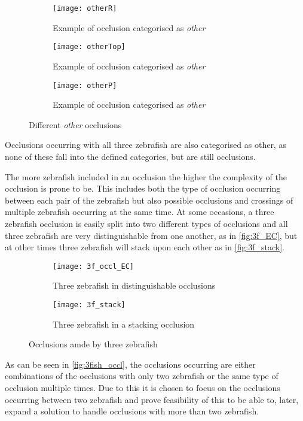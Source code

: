 \begin{figure}[H]
	\centering
	\begin{subfigure}[b]{0.3\textwidth}
		\texttt{[image: otherR]}
		\caption{Example of occlusion categorised as \textit{other}}
		\label{fig:otherR}
	\end{subfigure}
	\begin{subfigure}[b]{0.3\textwidth}
		\texttt{[image: otherTop]}
		\caption{Example of occlusion categorised as \textit{other}}
		\label{fig:otherTop}
	\end{subfigure}
	\begin{subfigure}[b]{0.3\textwidth}
		\texttt{[image: otherP]}
		\caption{Example of occlusion categorised as \textit{other}}
		\label{fig:otherP}
	\end{subfigure}
	\caption{Different \textit{other} occlusions}
	\label{fig:other}
\end{figure}

Occlusions occurring with all three zebrafish are also categorised as other, as none of these fall into the defined categories, but are still occlusions.

The more zebrafish included in an occlusion the higher the complexity of the occlusion is prone to be. This includes both the type of occlusion occurring between each pair of the zebrafish but also possible occlusions and crossings of multiple zebrafish occurring at the same time. 
At some occasions, a three zebrafish occlusion is easily split into two different types of occlusions and all three zebrafish are very distinguishable from one another, as in \autoref{fig:3f_EC}, but at other times three zebrafish will stack upon each other as in \autoref{fig:3f_stack}.

\begin{figure}[H]
	\centering
	\begin{subfigure}[b]{0.47\textwidth}
		\texttt{[image: 3f\_occl\_EC]}
		\caption{Three zebrafish in distinguishable occlusions}
		\label{fig:3f_EC}
	\end{subfigure}
	\begin{subfigure}[b]{0.47\textwidth}
		\texttt{[image: 3f\_stack]}
		\caption{Three zebrafish in a stacking occlusion}
		\label{fig:3f_stack}
	\end{subfigure}
	\caption{Occlusions amde by three zebrafish}
	\label{fig:3fish_occl}
\end{figure}

As can be seen in \autoref{fig:3fish_occl}, the occlusions occurring are either combinations of the occlusions with only two zebrafish or the same type of occlusion multiple times. Due to this it is chosen to focus on the occlusions occurring between two zebrafish and prove feasibility of this to be able to, later, expand a solution to handle occlusions with more than two zebrafish.

